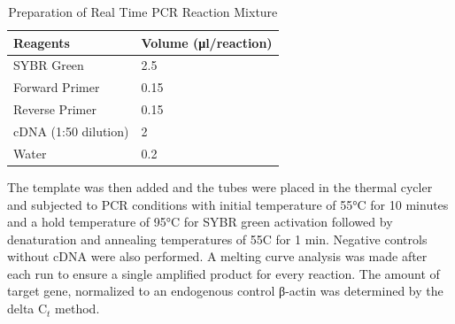 \begin{refsection}
\begin{table}[!h]
\centering
\caption[Preparation of Real Time PCR Reaction Mixture]{Preparation of Real Time PCR Reaction Mixture}
\label{tab:2.6rtmm}
\begin{tabular}{  p{1.5in} P{2in}  }
\toprule
	\textbf{Reagents} & \textbf{Volume (μl/reaction)} \\ \toprule
	SYBR Green & 2.5 \\ \midrule
	Forward Primer & 0.15 \\ \midrule
	Reverse Primer & 0.15 \\ \midrule
	cDNA (1:50 dilution) & 2 \\ \midrule
	Water & 0.2 \\ \bottomrule
\end{tabular}
\end{table}

The template was then added and the tubes were placed in the thermal cycler and subjected to PCR conditions with  initial temperature of 55°C for 10 minutes and a hold temperature of 95°C for SYBR green activation followed by denaturation and annealing temperatures of 55C for 1 min. Negative controls without cDNA were also performed. A melting curve analysis was made after each run to ensure a single amplified product for every reaction. The amount of target gene, normalized to an endogenous control β-actin was determined by the delta C$_t$ method.

\clearpage
\printbibliography[heading=subbibintoc]
\end{refsection}
